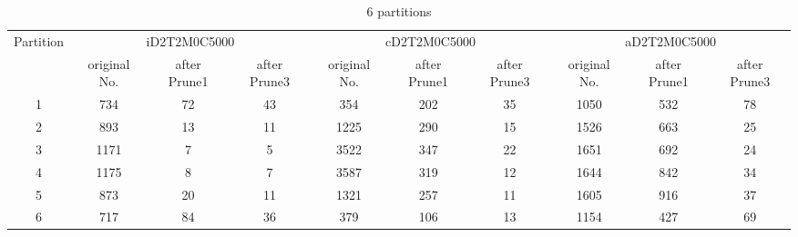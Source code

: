\begin{table*}[t]
  \centering
\makeatletter
    \long{}
\makeatother
  \caption{6 partitions}
    \vspace*{3pt}
  \footnotesize

  \label{table:partition6}
  \begin{tabular}{|c||c|c|c|c|c|c|c|c|c|}
  \hline
  \multirow{2}{*}{Partition} &  \multicolumn{3}{|c|}{iD2T2M0C5000} & \multicolumn{3}{|c|}{cD2T2M0C5000} &\multicolumn{3}{|c|}{aD2T2M0C5000} \\\cline{2-10}
    &  original No. & after Prune1 & after Prune3 & original No. & after Prune1 & after Prune3 & original No. & after Prune1 & after Prune3\\\hline\hline

\cline{2-10}
    1 &  734 & 72 & 43 & 354 & 202 & 35 & 1050  & 532 & 78 \\\hline

\cline{2-10}
    2 &  893 & 13 & 11 & 1225 & 290 & 15 & 1526 & 663 & 25 \\\hline

\cline{2-10}
    3 &  1171 & 7 & 5 & 3522 & 347 & 22 & 1651 & 692 & 24 \\\hline
    
\cline{2-10}
    4 &  1175 & 8 & 7 & 3587 & 319& 12 & 1644 & 842 & 34 \\\hline

\cline{2-10}
    5 &  873 & 20 & 11 & 1321 & 257 & 11 & 1605 & 916 & 37 \\\hline

\cline{2-10}
    6 &  717 & 84 & 36 & 379 & 106 & 13 & 1154 & 427 & 69 \\\hline

  \end{tabular}
  \vspace*{-17pt}
\end{table*}


